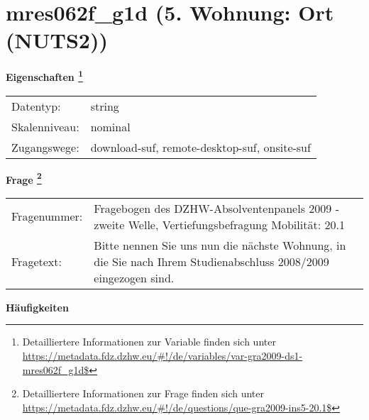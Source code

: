 
    \setcounter{footnote}{0}

    \vspace*{-1.8cm}
	\section{mres062f\_g1d (5. Wohnung: Ort (NUTS2))}
	\label{section:mres062f_g1d}



    \vspace*{0.5cm}
    \noindent\textbf{Eigenschaften
	\footnote{Detailliertere Informationen zur Variable finden sich unter
		\url{https://metadata.fdz.dzhw.eu/\#!/de/variables/var-gra2009-ds1-mres062f_g1d$}}}\\
	\begin{tabularx}{\hsize}{@{}lX}
	Datentyp: & string \\
	Skalenniveau: & nominal \\
	Zugangswege: &
	  download-suf, 
	  remote-desktop-suf, 
	  onsite-suf
 \\
    \end{tabularx}



				\vspace*{0.5cm}
                \noindent\textbf{Frage
	                \footnote{Detailliertere Informationen zur Frage finden sich unter
		              \url{https://metadata.fdz.dzhw.eu/\#!/de/questions/que-gra2009-ins5-20.1$}}}\\
				\begin{tabularx}{\hsize}{@{}lX}
					Fragenummer: &
					  Fragebogen des DZHW-Absolventenpanels 2009 - zweite Welle, Vertiefungsbefragung Mobilität:
					  20.1
 \\
					Fragetext: & Bitte nennen Sie uns nun die nächste Wohnung, in die Sie nach Ihrem Studienabschluss 2008/2009 eingezogen sind. \\
				\end{tabularx}





        		\vspace*{0.5cm}
                \noindent\textbf{Häufigkeiten}

